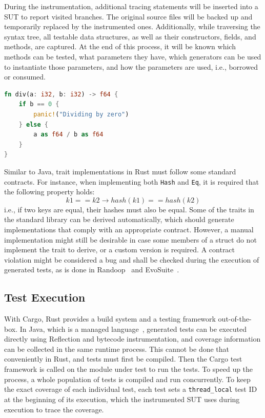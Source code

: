 \documentclass{article}
\begin{document}
During the instrumentation, additional tracing statements will be inserted into a \ac{SUT} to report visited branches. The original source files will be backed up and temporarily replaced by the instrumented ones. Additionally, while traversing the syntax tree, all testable data structures, as well as their constructors, fields, and methods, are captured. At the end of this process, it will be known which methods can be tested, what parameters they have, which generators can be used to instantiate those parameters, and how the parameters are used, i.e., borrowed or consumed. 

\begin{lstlisting}[language=Rust, style=boxed, caption=Division by zero transformation, label=lst:example-testability-transformation]
fn div(a: i32, b: i32) -> f64 {
    if b == 0 {
        panic!("Dividing by zero")
    } else {
        a as f64 / b as f64
    }
}
\end{lstlisting}

Similar to Java, trait implementations in Rust must follow some standard contracts. For instance, when implementing both \lstinline{Hash} and \lstinline{Eq}, it is required that the following property holds: 
\[
k1 == k2 \longrightarrow hash(k1) == hash(k2)
\] 
i.e., if two keys are equal, their hashes must also be equal. Some of the traits in the standard library can be derived automatically, which should generate implementations that comply with an appropriate contract. However, a manual implementation might still be desirable in case some members of a struct do not implement the trait to derive, or a custom version is required. A contract violation might be considered a bug and shall be checked during the execution of generated tests, as is done in Randoop~\cite{Pacheco_2007} and EvoSuite~\cite{Fraser2013}. 

\subsection{Test Execution}
With Cargo, Rust provides a build system and a testing framework out-of-the-box. In Java, which is a managed language~\cite{Gough2005}, generated tests can be executed directly using Reflection and bytecode instrumentation, and coverage information can be collected in the same runtime process. This cannot be done that conveniently in Rust, and tests must first be compiled. Then the Cargo test framework is called on the module under test to run the tests. To speed up the process, a whole population of tests is compiled and run concurrently. To keep the exact coverage of each individual test, each test sets a \lstinline{thread_local} test ID at the beginning of its execution, which the instrumented \ac{SUT} uses during execution to trace the coverage. 
\end{document}

